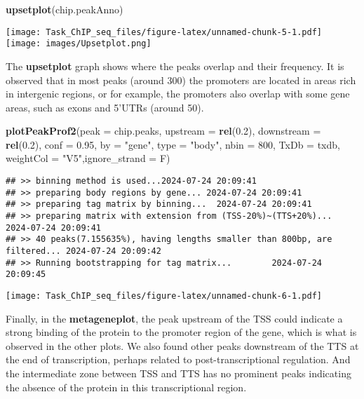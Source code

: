 \documentclass[
]{article}
\newenvironment{Shaded}{\begin{snugshade}}{\end{snugshade}}
\newcommand{\AttributeTok}[1]{\textcolor[rgb]{0.13,0.29,0.53}{#1}}
\newcommand{\DecValTok}[1]{\textcolor[rgb]{0.00,0.00,0.81}{#1}}
\newcommand{\FloatTok}[1]{\textcolor[rgb]{0.00,0.00,0.81}{#1}}
\newcommand{\FunctionTok}[1]{\textcolor[rgb]{0.13,0.29,0.53}{\textbf{#1}}}
\newcommand{\NormalTok}[1]{#1}
\newcommand{\StringTok}[1]{\textcolor[rgb]{0.31,0.60,0.02}{#1}}
\begin{document}
\begin{Shaded}
\begin{Highlighting}[]
\FunctionTok{upsetplot}\NormalTok{(chip.peakAnno)}
\end{Highlighting}
\end{Shaded}

\texttt{[image: Task\_ChIP\_seq\_files/figure-latex/unnamed-chunk-5-1.pdf]}
\texttt{[image: images/Upsetplot.png]}

The \textbf{upsetplot} graph shows where the peaks overlap and their
frequency. It is observed that in most peaks (around 300) the promoters
are located in areas rich in intergenic regions, or for example, the
promoters also overlap with some gene areas, such as exons and 5'UTRs
(around 50).

\begin{Shaded}
\begin{Highlighting}[]
\FunctionTok{plotPeakProf2}\NormalTok{(}\AttributeTok{peak =}\NormalTok{ chip.peaks, }\AttributeTok{upstream =} \FunctionTok{rel}\NormalTok{(}\FloatTok{0.2}\NormalTok{), }\AttributeTok{downstream =} \FunctionTok{rel}\NormalTok{(}\FloatTok{0.2}\NormalTok{),}
              \AttributeTok{conf =} \FloatTok{0.95}\NormalTok{, }\AttributeTok{by =} \StringTok{"gene"}\NormalTok{, }\AttributeTok{type =} \StringTok{"body"}\NormalTok{, }\AttributeTok{nbin =} \DecValTok{800}\NormalTok{,}
              \AttributeTok{TxDb =}\NormalTok{ txdb, }\AttributeTok{weightCol =} \StringTok{"V5"}\NormalTok{,}\AttributeTok{ignore\_strand =}\NormalTok{ F)}
\end{Highlighting}
\end{Shaded}

\begin{verbatim}
## >> binning method is used...2024-07-24 20:09:41
## >> preparing body regions by gene... 2024-07-24 20:09:41
## >> preparing tag matrix by binning...  2024-07-24 20:09:41 
## >> preparing matrix with extension from (TSS-20%)~(TTS+20%)... 2024-07-24 20:09:41
## >> 40 peaks(7.155635%), having lengths smaller than 800bp, are filtered... 2024-07-24 20:09:42
## >> Running bootstrapping for tag matrix...        2024-07-24 20:09:45
\end{verbatim}

\texttt{[image: Task\_ChIP\_seq\_files/figure-latex/unnamed-chunk-6-1.pdf]}

Finally, in the \textbf{metageneplot}, the peak upstream of the TSS
could indicate a strong binding of the protein to the promoter region of
the gene, which is what is observed in the other plots. We also found
other peaks downstream of the TTS at the end of transcription, perhaps
related to post-transcriptional regulation. And the intermediate zone
between TSS and TTS has no prominent peaks indicating the absence of the
protein in this transcriptional region.
\end{document}
